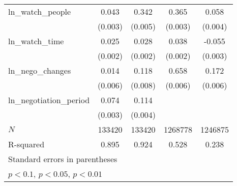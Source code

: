 {\begin{tabular}{l*{4}{c}}
ln\_watch\_people&       0.043\sym{***}&       0.342\sym{***}&       0.365\sym{***}&       0.058\sym{***}\\
            &     (0.003)         &     (0.005)         &     (0.003)         &     (0.004)         \\
\addlinespace
ln\_watch\_time&       0.025\sym{***}&       0.028\sym{***}&       0.038\sym{***}&      -0.055\sym{***}\\
            &     (0.002)         &     (0.002)         &     (0.002)         &     (0.003)         \\
\addlinespace
ln\_nego\_changes&       0.014\sym{**} &       0.118\sym{***}&       0.658\sym{***}&       0.172\sym{***}\\
            &     (0.006)         &     (0.008)         &     (0.006)         &     (0.006)         \\
\addlinespace
ln\_negotiation\_period&       0.074\sym{***}&       0.114\sym{***}&                     &                     \\
            &     (0.003)         &     (0.004)         &                     &                     \\
\midrule
\(N\)       &      133420         &      133420         &     1268778         &     1246875         \\
R-squared   &       0.895         &       0.924         &       0.528         &       0.238         \\
\bottomrule
\multicolumn{5}{l}{\footnotesize Standard errors in parentheses}\\
\multicolumn{5}{l}{\footnotesize \sym{*} \(p<0.1\), \sym{**} \(p<0.05\), \sym{***} \(p<0.01\)}\\
\end{tabular}
}
